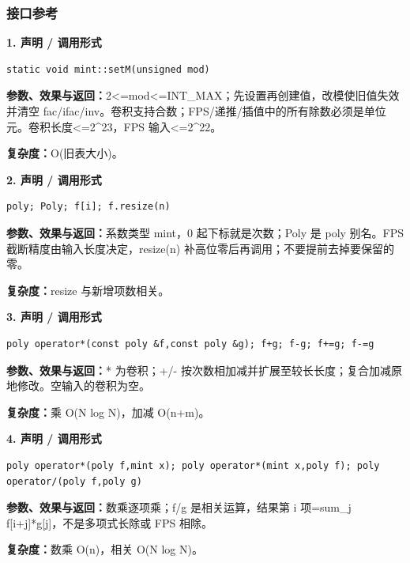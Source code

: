 \documentclass[UTF8,a4paper,10pt]{ctexart}
\begin{document}
\subsubsection*{接口参考}
\noindent\begin{minipage}{\textwidth}
\textbf{1. 声明 / 调用形式}
\begin{lstlisting}
static void mint::setM(unsigned mod)
\end{lstlisting}
\textbf{参数、效果与返回：}2<=mod<=INT\_MAX；先设置再创建值，改模使旧值失效并清空 fac/ifac/inv。卷积支持合数；FPS/递推/插值中的所有除数必须是单位元。卷积长度<=2\textasciicircum{}23，FPS 输入<=2\textasciicircum{}22。

\textbf{复杂度：}O(旧表大小)。

\end{minipage}\par\vspace{0.4em}
\noindent\begin{minipage}{\textwidth}
\textbf{2. 声明 / 调用形式}
\begin{lstlisting}
poly; Poly; f[i]; f.resize(n)
\end{lstlisting}
\textbf{参数、效果与返回：}系数类型 mint，0 起下标就是次数；Poly 是 poly 别名。FPS 截断精度由输入长度决定，resize(n) 补高位零后再调用；不要提前去掉要保留的零。

\textbf{复杂度：}resize 与新增项数相关。

\end{minipage}\par\vspace{0.4em}
\noindent\begin{minipage}{\textwidth}
\textbf{3. 声明 / 调用形式}
\begin{lstlisting}
poly operator*(const poly &f,const poly &g); f+g; f-g; f+=g; f-=g
\end{lstlisting}
\textbf{参数、效果与返回：}* 为卷积；+/- 按次数相加减并扩展至较长长度；复合加减原地修改。空输入的卷积为空。

\textbf{复杂度：}乘 O(N log N)，加减 O(n+m)。

\end{minipage}\par\vspace{0.4em}
\noindent\begin{minipage}{\textwidth}
\textbf{4. 声明 / 调用形式}
\begin{lstlisting}
poly operator*(poly f,mint x); poly operator*(mint x,poly f); poly operator/(poly f,poly g)
\end{lstlisting}
\textbf{参数、效果与返回：}数乘逐项乘；f/g 是相关运算，结果第 i 项=sum\_j f[i+j]*g[j]，不是多项式长除或 FPS 相除。

\textbf{复杂度：}数乘 O(n)，相关 O(N log N)。

\end{minipage}\par\vspace{0.4em}
\end{document}
